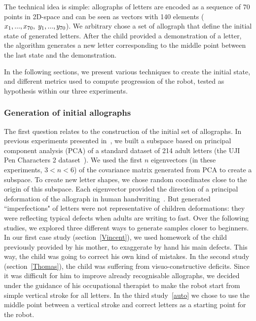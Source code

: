\documentclass{sig-alternate}
\begin{document}
The technical idea is simple: allographs of letters are encoded as a sequence of 70 points in
2D-space and can be seen as vectors with 140 elements
($x_1,...,x_{70},\hspace{1mm}y_1,...,y_{70}$). We arbitrary chose a set of allograph
that define the initial state of generated letters. 
After the child provided a demonstration of a letter, the algorithm
generates a new letter corresponding to the middle point between the last state and the
demonstration. 

In the following sections, we present various techniques to
create the initial state, and different metrics used to compute progression of the robot, tested as hypothesis within our three experiments. 

\subsubsection{Generation of initial allographs}
The first question relates to the construction of the initial set of allographs.
In previous experiments presented in~\cite{hood2015when}, we built a subspace based on principal component
analysis (PCA) of a standard dataset of 214 adult letters (the UJI Pen Characters 2 dataset~\cite{Llorens2008}).
We used the first $n$ eigenvectors (in
these experiments, $3 < n < 6$) of the covariance matrix
generated from PCA to create a subspace. To create new letter shapes, we chose
random coordinates close to the origin of this subspace. Each eigenvector
provided the direction of a principal deformation of the allograph in human
handwriting~\cite{Hood}. But generated ``imperfections" of letters were not representative of
children deformations: they were reflecting typical defects when adults are writing to fast. 
Over the following studies, we explored three different ways to generate samples closer to beginners. In our first case study (section~\ref{Vincent}), we used homework of the child previously provided
by his mother, to exaggerate by hand his main defects. This way, the child was
going to correct his own kind of mistakes. In the second study (section~\ref{Thomas}),
the child was suffering from visuo-constructive deficits. Since it was
difficult for him to improve already recognisable allographs, we decided under the
guidance of his occupational therapist to make the robot start from simple
vertical stroke for all letters. In
the third study~\ref{auto} we chose to use the middle point between a vertical stroke
and correct letters as a starting point for the robot. 
\end{document}
